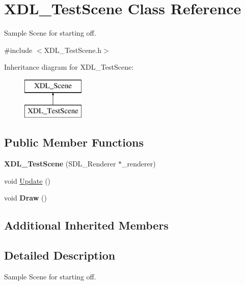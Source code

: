 \hypertarget{class_x_d_l___test_scene}{\section{X\-D\-L\-\_\-\-Test\-Scene Class Reference}
\label{class_x_d_l___test_scene}
}


Sample Scene for starting off.  




{\ttfamily \#include $<$X\-D\-L\-\_\-\-Test\-Scene.\-h$>$}

Inheritance diagram for X\-D\-L\-\_\-\-Test\-Scene\-:\begin{figure}[H]
\begin{center}
\leavevmode
\includegraphics[height=2.000000cm]{class_x_d_l___test_scene}
\end{center}
\end{figure}
\subsection*{Public Member Functions}
\begin{DoxyCompactItemize}
\item 
\hypertarget{class_x_d_l___test_scene_a510dea25d4b735519b89958a4cf46422}{{\bfseries X\-D\-L\-\_\-\-Test\-Scene} (S\-D\-L\-\_\-\-Renderer $\ast$\-\_\-renderer)}\label{class_x_d_l___test_scene_a510dea25d4b735519b89958a4cf46422}

\item 
void \hyperlink{class_x_d_l___test_scene_a499dd5fc238bce5d33a434c85263fd86}{Update} ()
\item 
\hypertarget{class_x_d_l___test_scene_a295ef410fc9918569e8af6d66b733476}{void {\bfseries Draw} ()}\label{class_x_d_l___test_scene_a295ef410fc9918569e8af6d66b733476}

\end{DoxyCompactItemize}
\subsection*{Additional Inherited Members}


\subsection{Detailed Description}
Sample Scene for starting off. 

